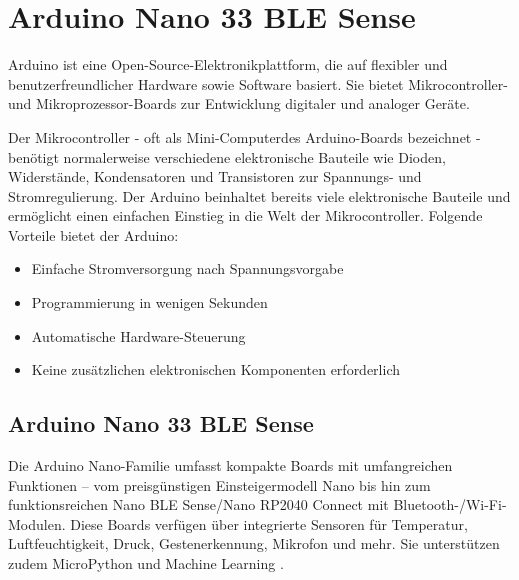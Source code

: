 %
%
%


\chapter{Arduino Nano 33 BLE Sense}\label{NanoBLESense}

Arduino ist eine Open-Source-Elektronikplattform, die auf flexibler und benutzerfreundlicher Hardware sowie Software basiert. Sie bietet Mikrocontroller- und Mikroprozessor-Boards zur Entwicklung digitaler und analoger Geräte.

Der Mikrocontroller - oft als \glqq Mini-Computer\grqq des Arduino-Boards bezeichnet - benötigt normalerweise verschiedene elektronische Bauteile wie Dioden, Widerstände, Kondensatoren und Transistoren zur Spannungs- und Stromregulierung. Der Arduino beinhaltet bereits viele elektronische Bauteile und ermöglicht einen einfachen Einstieg in die Welt der Mikrocontroller. Folgende Vorteile bietet der Arduino:

\begin{itemize}
	\item Einfache Stromversorgung nach Spannungsvorgabe
	\item Programmierung in wenigen Sekunden
	\item Automatische Hardware-Steuerung
	\item Keine zusätzlichen elektronischen Komponenten erforderlich
\end{itemize}
\cite{ArduinoWeb:2025}

\section{Arduino Nano 33 BLE Sense}

Die Arduino Nano-Familie umfasst kompakte Boards mit umfangreichen Funktionen – vom preisgünstigen Einsteigermodell Nano bis hin zum funktionsreichen Nano BLE Sense/Nano RP2040 Connect mit Bluetooth-/Wi-Fi-Modulen. Diese Boards verfügen über integrierte Sensoren für Temperatur, Luftfeuchtigkeit, Druck, Gestenerkennung, Mikrofon und mehr. Sie unterstützen zudem MicroPython und Machine Learning \cite{Raj:2019}.

